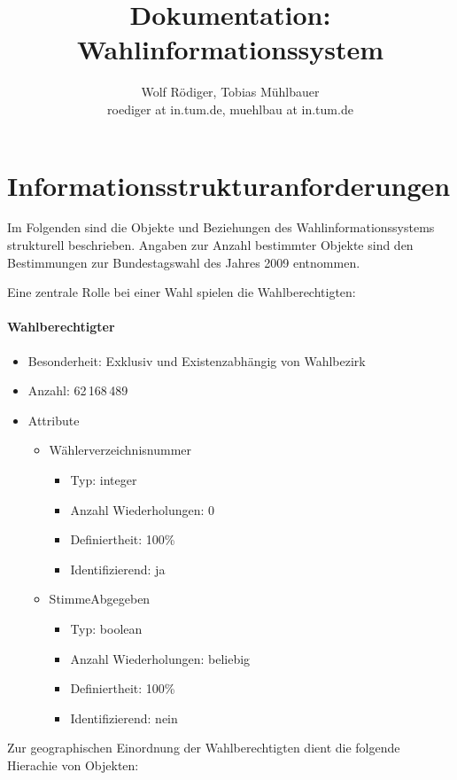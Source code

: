 \documentclass[a4paper]{article}
\author{Wolf Rödiger, Tobias Mühlbauer \\ roediger at in.tum.de, muehlbau at in.tum.de}
\title{Dokumentation: Wahlinformationssystem}
\begin{document}
\maketitle

\newpage

\tableofcontents

\newpage

\section{Informationsstrukturanforderungen}

Im Folgenden sind die Objekte und Beziehungen des Wahlinformationssystems strukturell beschrieben. Angaben zur Anzahl bestimmter Objekte sind den Bestimmungen zur Bundestagswahl des Jahres 2009 entnommen.

Eine zentrale Rolle bei einer Wahl spielen die Wahlberechtigten:

\paragraph{Wahlberechtigter}
\begin{itemize}
\item Besonderheit: Exklusiv und Existenzabhängig von Wahlbezirk
\item Anzahl: 62\,168\,489
\item Attribute
	\begin{itemize}
	\item Wählerverzeichnisnummer
		\begin{itemize}
		\item Typ: integer
		\item Anzahl Wiederholungen: 0
		\item Definiertheit: 100\%
		\item Identifizierend: ja
		\end{itemize}
	\item StimmeAbgegeben
		\begin{itemize}
		\item Typ: boolean
		\item Anzahl Wiederholungen: beliebig
		\item Definiertheit: 100\%
		\item Identifizierend: nein
		\end{itemize}
	\end{itemize}
\end{itemize}

Zur geographischen Einordnung der Wahlberechtigten dient die folgende Hierachie von Objekten:
\end{document}
